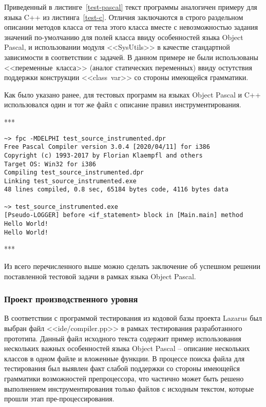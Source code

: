Приведенный в листинге~\ref{test-pascal} текст программы аналогичен примеру для языка C++ из листинга~\ref{test-c}.
Отличия заключаются в строго раздельном описании методов класса от тела этого класса вместе с невозможностью задания значений по-умолчанию для полей класса ввиду особенностей языка Object Pascal, и использовании модуля <<SysUtils>> в качестве стандартной зависимости в соответствии с задачей.
В данном примере не были использованы <<переменные~класса>> (аналог статических переменных) ввиду остутствия поддержки конструкции <<class~var>> со стороны имеющейся грамматики.

Как было указано ранее, для тестовых программ на языках Object Pascal и C++ использовался один и тот же файл с описание правил инструментирования.

***

\begin{lstlisting}[frame=single, label={test-pascal-run}, caption={Результаты запуска обработанного тестового приложения.}]
~> fpc -MDELPHI test_source_instrumented.dpr
Free Pascal Compiler version 3.0.4 [2020/04/11] for i386
Copyright (c) 1993-2017 by Florian Klaempfl and others
Target OS: Win32 for i386
Compiling test_source_instrumented.dpr
Linking test_source_instrumented.exe
48 lines compiled, 0.8 sec, 65184 bytes code, 4116 bytes data

~> test_source_instrumented.exe
[Pseudo-LOGGER] before <if_statement> block in [Main.main] method
Hello World!
Hello World!
\end{lstlisting}

***

Из всего перечисленного выше можно сделать заключение об успешном решении поставленной тестовой задачи в рамках языка Object Pascal.

\subsubsection{Проект производственного уровня}

В соответствии с программой тестирования из кодовой базы проекта Lazarus был выбран файл <<ide/compiler.pp>> в рамках тестирования разработанного прототипа.
Данный файл исходного текста содержит пример использования нескольких важных особенностей языка Object Pascal -- описание нескольких классов в одном файле и вложенные функции.
В процессе поиска файла для тестирования был выявлен факт слабой поддержки со стороны имеющейся грамматики возможностей препроцессора, что частично может быть решено выполнением инструментирования только файлов с исходным текстом, которые прошли этап пре-процессирования.

